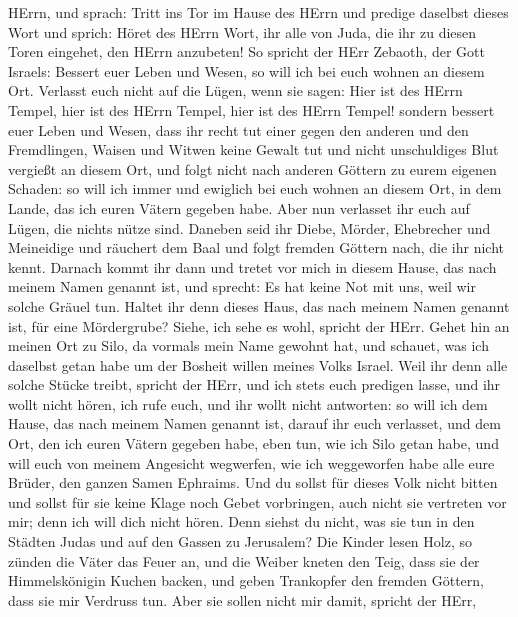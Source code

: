 HErrn, und sprach:  Tritt ins Tor im Hause des HErrn und
predige daselbst dieses Wort und sprich: Höret des HErrn Wort, ihr alle
von Juda, die ihr zu diesen Toren eingehet, den HErrn anzubeten!
 So spricht der HErr Zebaoth, der Gott Israels: Bessert euer
Leben und Wesen, so will ich bei euch wohnen an diesem Ort. 
Verlasst euch nicht auf die Lügen, wenn sie sagen: Hier ist des HErrn
Tempel, hier ist des HErrn Tempel, hier ist des HErrn Tempel!
 sondern bessert euer Leben und Wesen, dass ihr recht tut
einer gegen den anderen  und den Fremdlingen, Waisen und
Witwen keine Gewalt tut und nicht unschuldiges Blut vergießt an diesem
Ort, und folgt nicht nach anderen Göttern zu eurem eigenen Schaden:
 so will ich immer und ewiglich bei euch wohnen an diesem
Ort, in dem Lande, das ich euren Vätern gegeben habe.  Aber
nun verlasset ihr euch auf Lügen, die nichts nütze sind. 
Daneben seid ihr Diebe, Mörder, Ehebrecher und Meineidige und räuchert
dem Baal und folgt fremden Göttern nach, die ihr nicht kennt.
 Darnach kommt ihr dann und tretet vor mich in diesem
Hause, das nach meinem Namen genannt ist, und sprecht: Es hat keine Not
mit uns, weil wir solche Gräuel tun.  Haltet ihr denn
dieses Haus, das nach meinem Namen genannt ist, für eine Mördergrube?
Siehe, ich sehe es wohl, spricht der HErr.  Gehet hin an
meinen Ort zu Silo, da vormals mein Name gewohnt hat, und schauet, was
ich daselbst getan habe um der Bosheit willen meines Volks Israel.
 Weil ihr denn alle solche Stücke treibt, spricht der HErr,
und ich stets euch predigen lasse, und ihr wollt nicht hören, ich rufe
euch, und ihr wollt nicht antworten:  so will ich dem
Hause, das nach meinem Namen genannt ist, darauf ihr euch verlasset, und
dem Ort, den ich euren Vätern gegeben habe, eben tun, wie ich Silo getan
habe,  und will euch von meinem Angesicht wegwerfen, wie
ich weggeworfen habe alle eure Brüder, den ganzen Samen Ephraims.
 Und du sollst für dieses Volk nicht bitten und sollst für
sie keine Klage noch Gebet vorbringen, auch nicht sie vertreten vor mir;
denn ich will dich nicht hören.  Denn siehst du nicht, was
sie tun in den Städten Judas und auf den Gassen zu Jerusalem?
 Die Kinder lesen Holz, so zünden die Väter das Feuer an,
und die Weiber kneten den Teig, dass sie der Himmelskönigin Kuchen
backen, und geben Trankopfer den fremden Göttern, dass sie mir Verdruss
tun.  Aber sie sollen nicht mir damit, spricht der HErr,
